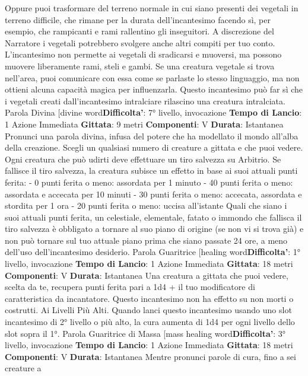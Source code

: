 \begin{multicols}{2}
Oppure puoi trasformare del terreno normale in cui
siano presenti dei vegetali in terreno difficile, che
rimane per la durata dell’incantesimo facendo sì, per
esempio, che rampicanti e rami rallentino gli inseguitori.
A discrezione del Narratore i vegetali potrebbero svolgere
anche altri compiti per tuo conto. L’incantesimo non
permette ai vegetali di sradicarsi e muoversi, ma
possono muovere liberamente rami, steli e gambi.
Se una creatura vegetale si trova nell’area, puoi
comunicare con essa come se parlaste lo stesso
linguaggio, ma non ottieni alcuna capacità magica per
influenzarla.
Questo incantesimo può far sì che i vegetali creati
dall’incantesimo intralciare rilascino una creatura
intralciata.
Parola Divina
[divine word\textbf{Difficolta'}:
7° livello, invocazione
\textbf{Tempo di Lancio}: 1 Azione Immediata
\textbf{Gittata}: 9 metri
\textbf{Componenti}: V
\textbf{Durata}: Istantanea
Pronunci una parola divina, infusa del potere che ha
modellato il mondo all’alba della creazione. Scegli un
qualsiasi numero di creature a gittata e che puoi
vedere. Ogni creatura che può udirti deve effettuare un
tiro salvezza su Arbitrio. Se fallisce il tiro salvezza, la
creatura subisce un effetto in base ai suoi attuali punti
ferita:
- 0 punti ferita o meno: assordata per 1 minuto
- 40 punti ferita o meno: assordata e accecata per 10
minuti
- 30 punti ferita o meno: accecata, assordata e
stordita per 1 ora
- 20 punti ferita o meno: uccisa all’istante
Quali che siano i suoi attuali punti ferita, un celestiale,
elementale, fatato o immondo che fallisca il tiro
salvezza è obbligato a tornare al suo piano di origine
(se non vi si trova già) e non può tornare sul tuo attuale
piano prima che siano passate 24 ore, a meno dell’uso
dell’incantesimo desiderio.
Parola Guaritrice
[healing word\textbf{Difficolta'}:
1° livello, invocazione
\textbf{Tempo di Lancio}: 1 Azione Immediata
\textbf{Gittata}: 18 metri
\textbf{Componenti}: V
\textbf{Durata}: Istantanea
Una creatura a gittata che puoi vedere, scelta da te,
recupera punti ferita pari a 1d4 + il tuo modificatore di
caratteristica da incantatore. Questo incantesimo non
ha effetto su non morti o costrutti.
Ai Livelli Più Alti. Quando lanci questo incantesimo
usando uno slot incantesimo di 2° livello o più alto, la
cura aumenta di 1d4 per ogni livello dello slot sopra il
1°.
Parola Guaritrice di Massa
[mass healing word\textbf{Difficolta'}:
3° livello, invocazione
\textbf{Tempo di Lancio}: 1 Azione Immediata
\textbf{Gittata}: 18 metri
\textbf{Componenti}: V
\textbf{Durata}: Istantanea
Mentre pronunci parole di cura, fino a sei creature a

\end{multicols}
